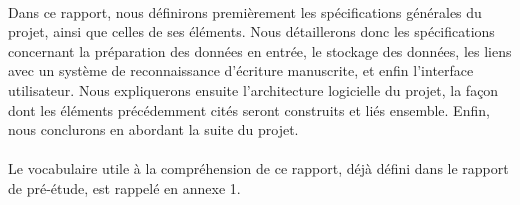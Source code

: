 \paragraph{}
Dans ce rapport, nous définirons premièrement les spécifications générales du
projet, ainsi que celles de ses éléments. Nous détaillerons donc les
spécifications concernant la préparation des données en entrée, le stockage
des données, les liens avec un système de reconnaissance
d’écriture manuscrite, et enfin l’interface utilisateur. Nous expliquerons
ensuite l’architecture logicielle du projet, la façon dont les éléments
précédemment cités seront construits et liés ensemble. Enfin, nous conclurons
en abordant la suite du projet.

\paragraph{}
Le vocabulaire utile à la compréhension de ce rapport, déjà défini dans le
rapport de pré-étude, est rappelé en annexe 1.
